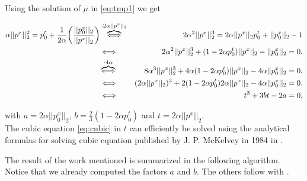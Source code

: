 \begin{enumerate}
        Using the solution of $\mu$ in \ref{eq:tmp1} we get

        \begin{eqnarray}
            \alpha ||p^{x}||_{2}^{2} = p_{0}^{t} + \frac{1}{2 \alpha} \bigg( \frac{||p_{0}^{x}||_{2}}{||p^{x}||_{2}} \bigg) &\overbrace{\Longleftrightarrow}^{\cdot 2 \alpha ||p^{x}||_{2}}& 2 \alpha^{2} ||p^{x}||_{2}^{3} = 2 \alpha ||p^{x}||_{2} p_{0}^{t} + ||p_{0}^{x}||_{2} - 1 \notag \\
            &\Longleftrightarrow& 2 \alpha^{2} ||p^{x}||_{2}^{3} + (1 - 2 \alpha p_{0}^{t}) ||p^{x}||_{2} - ||p_{0}^{x}||_{2} = 0. \notag \\ 
            &\overbrace{\Longleftrightarrow}^{\cdot 4 \alpha}& 8 \alpha^{3} ||p^{x}||_{2}^{3} + 4 \alpha (1 - 2 \alpha p_{0}^{t}) ||p^{x}||_{2} - 4 \alpha ||p_{0}^{x}||_{2} = 0. \notag \\
            &\Longleftrightarrow& (2 \alpha ||p^{x}||_{2})^{3} + 2 (1 - 2 \alpha p_{0}^{t}) 2 \alpha ||p^{x}||_{2} - 4 \alpha ||p_{0}^{x}||_{2} = 0. \notag \\
            &\Longleftrightarrow& t^{3} + 3bt - 2a = 0, \label{eq:cubic}
        \end{eqnarray}

        with $a = 2 \alpha ||p_{0}^{x}||_{2}$, $b = \frac{2}{3}(1 - 2 \alpha p_{0}^{t})$ and $t = 2 \alpha ||p^{x}||_{2}$.\\
        The cubic equation \ref{eq:cubic} in $t$ can efficiently be solved using the analytical formulas for solving cubic equation published by J. P. McKelvey in 1984 in \cite{kelvey-ajp}.

        \end{enumerate}

        The result of the work mentioned is summarized in the following algorithm. Notice that we already computed the factors $a$ and $b$. The others follow with \cite{kelvey-ajp}.



